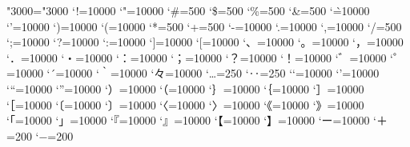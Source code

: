 \ifnum\ucs"3000="3000 \else
    \@@end
\fi
\prebreakpenalty`!=10000
\prebreakpenalty`"=10000
\postbreakpenalty`\#=500
\postbreakpenalty`\$=500
\prebreakpenalty`\%=500
\prebreakpenalty`\&=500
\postbreakpenalty`\`=10000
\prebreakpenalty`'=10000
\prebreakpenalty`)=10000
\postbreakpenalty`(=10000
\prebreakpenalty`*=500
\prebreakpenalty`+=500
\prebreakpenalty`-=10000
\prebreakpenalty`.=10000
\prebreakpenalty`,=10000
\prebreakpenalty`/=500
\prebreakpenalty`;=10000
\prebreakpenalty`?=10000
\prebreakpenalty`:=10000
\prebreakpenalty`]=10000
\postbreakpenalty`[=10000
\prebreakpenalty`、=10000
\prebreakpenalty`。=10000
\prebreakpenalty`，=10000
\prebreakpenalty`．=10000
\prebreakpenalty`・=10000
\prebreakpenalty`：=10000
\prebreakpenalty`；=10000
\prebreakpenalty`？=10000
\prebreakpenalty`！=10000
\prebreakpenalty`゛=10000%
\prebreakpenalty`゜=10000%
\prebreakpenalty`´=10000%
\postbreakpenalty`｀=10000%
\prebreakpenalty`々=10000%
\prebreakpenalty`…=250%
\prebreakpenalty`‥=250%
\postbreakpenalty`‘=10000%
\prebreakpenalty`’=10000%
\postbreakpenalty`“=10000%
\prebreakpenalty`”=10000%
\prebreakpenalty`）=10000
\postbreakpenalty`（=10000
\prebreakpenalty`｝=10000
\postbreakpenalty`｛=10000
\prebreakpenalty`］=10000
\postbreakpenalty`［=10000
\postbreakpenalty`〔=10000%
\prebreakpenalty`〕=10000%
\postbreakpenalty`〈=10000%
\prebreakpenalty`〉=10000%
\postbreakpenalty`《=10000%
\prebreakpenalty`》=10000%
\postbreakpenalty`「=10000%
\prebreakpenalty`」=10000%
\postbreakpenalty`『=10000%
\prebreakpenalty`』=10000%
\postbreakpenalty`【=10000%
\prebreakpenalty`】=10000%
\prebreakpenalty`ー=10000
\prebreakpenalty`＋=200
\prebreakpenalty`−=200%
